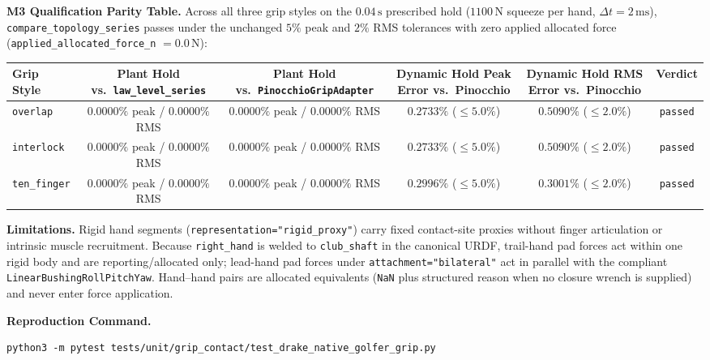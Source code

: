 \documentclass[11pt,a4paper]{article}
\begin{document}
\textbf{M3 Qualification Parity Table.}
Across all three grip styles on the $0.04\,\mathrm{s}$ prescribed hold ($1100\,\mathrm{N}$ squeeze per hand, $\Delta t = 2\,\mathrm{ms}$), \texttt{compare\_topology\_series} passes under the unchanged $5\%$ peak and $2\%$ RMS tolerances with zero applied allocated force (\texttt{applied\_allocated\_force\_n} $= 0.0\,\mathrm{N}$):
\begin{center}
\begin{tabular}{lccccc}
\toprule
Grip Style & Plant Hold vs.\ \texttt{law\_level\_series} & Plant Hold vs.\ \texttt{PinocchioGripAdapter} & Dynamic Hold Peak Error vs.\ Pinocchio & Dynamic Hold RMS Error vs.\ Pinocchio & Verdict \\
\midrule
\texttt{overlap} & $0.0000\%$ peak / $0.0000\%$ RMS & $0.0000\%$ peak / $0.0000\%$ RMS & $0.2733\%$ ($\le 5.0\%$) & $0.5090\%$ ($\le 2.0\%$) & \texttt{passed} \\
\texttt{interlock} & $0.0000\%$ peak / $0.0000\%$ RMS & $0.0000\%$ peak / $0.0000\%$ RMS & $0.2733\%$ ($\le 5.0\%$) & $0.5090\%$ ($\le 2.0\%$) & \texttt{passed} \\
\texttt{ten\_finger} & $0.0000\%$ peak / $0.0000\%$ RMS & $0.0000\%$ peak / $0.0000\%$ RMS & $0.2996\%$ ($\le 5.0\%$) & $0.3001\%$ ($\le 2.0\%$) & \texttt{passed} \\
\bottomrule
\end{tabular}
\end{center}

\textbf{Limitations.}
Rigid hand segments (\texttt{representation="rigid\_proxy"}) carry fixed contact-site proxies without finger articulation or intrinsic muscle recruitment. Because \texttt{right\_hand} is welded to \texttt{club\_shaft} in the canonical URDF, trail-hand pad forces act within one rigid body and are reporting/allocated only; lead-hand pad forces under \texttt{attachment="bilateral"} act in parallel with the compliant \texttt{LinearBushingRollPitchYaw}. Hand--hand pairs are allocated equivalents (\texttt{NaN} plus structured reason when no closure wrench is supplied) and never enter force application.

\textbf{Reproduction Command.}
\begin{verbatim}
python3 -m pytest tests/unit/grip_contact/test_drake_native_golfer_grip.py
\end{verbatim}
\end{document}
